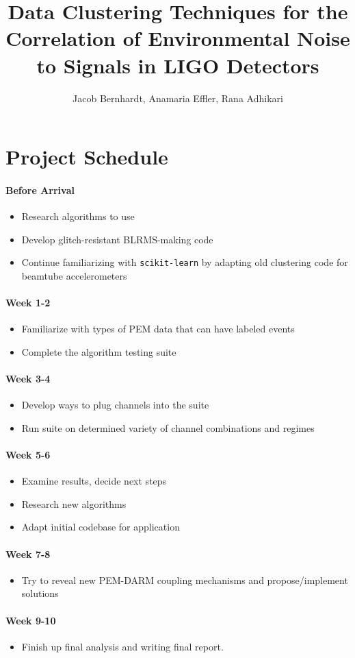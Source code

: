 \documentclass[colorlinks=true,pdfstartview=FitV,linkcolor=blue,
            citecolor=red,urlcolor=magenta]{ligodoc}
\title{Data Clustering Techniques for the Correlation of Environmental Noise to Signals in LIGO Detectors}
\author{Jacob Bernhardt, Anamaria Effler, Rana Adhikari}
\begin{document}


\section{Project Schedule}
\paragraph{Before Arrival}
\begin{itemize}
\item Research algorithms to use
\item Develop glitch-resistant BLRMS-making code
\item Continue familiarizing with \texttt{scikit-learn} by adapting old clustering code for beamtube accelerometers
\end{itemize}
\paragraph{Week 1-2}
\begin{itemize}
\item Familiarize with types of PEM data that can have labeled events
\item Complete the algorithm testing suite
\end{itemize}
\paragraph{Week 3-4}
\begin{itemize}
\item Develop ways to plug channels into the suite
\item Run suite on determined variety of channel combinations and regimes
\end{itemize}
\paragraph{Week 5-6}
\begin{itemize}
\item Examine results, decide next steps
\item Research new algorithms
\item Adapt initial codebase for application
\end{itemize}
\paragraph{Week 7-8}
\begin{itemize}
\item Try to reveal new PEM-DARM coupling mechanisms and propose/implement solutions
\end{itemize}
\paragraph{Week 9-10}
\begin{itemize}
\item Finish up final analysis and writing final report.
\end{itemize}


\end{document}
